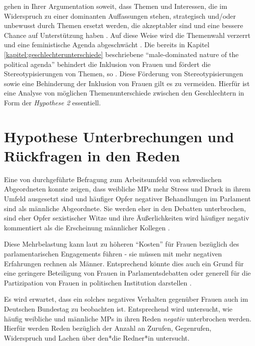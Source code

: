 \documentclass[12pt, 
    twoside=false, 
    bibliography=totoc, 
    numbers=endperiod, 
    headings=normal, 
    toc=chapterentrydotfill
    ]{scrbook}
\begin{document}
\textcite{celis_2018} gehen in Ihrer Argumentation soweit, dass Themen und Interessen, die im Widerspruch zu einer dominanten Auffassungen stehen, strategisch und/oder unbewusst durch Themen ersetzt werden, die akzeptabler sind und eine bessere Chance auf Unterstützung haben \parencites[151]{celis_2018}{swers_2002}. 
Auf diese Weise wird die Themenwahl verzerrt und eine feministische Agenda abgeschwächt \parencite[151]{celis_2018}. Die bereits in Kapitel \ref{kapitel:geschlechterunterschiede} beschriebene \enquote{male-dominated nature of the political agenda} \parencite[151]{celis_2018} behindert die Inklusion von Frauen und fördert die Stereotypisierungen von Themen, so \textcite{celis_2018}.
Diese Förderung von Stereotypisierungen sowie eine Behinderung der Inklusion von Frauen gilt es zu vermeiden. Hierfür ist eine Analyse von möglichen Themenunterschiede zwischen den Geschlechtern in Form der \emph{Hypothese 2} essentiell. 

\section{Hypothese Unterbrechungen und Rückfragen in den Reden}\label{kapitel:hypothese3}

Eine von \textcite{erikson_2018} durchgeführte Befragung zum Arbeitsumfeld von schwedischen Abgeordneten konnte zeigen, dass weibliche MPs mehr Stress und Druck in ihrem Umfeld ausgesetzt sind und häufiger Opfer negativer Behandlungen im Parlament sind als männliche Abgeordnete. Sie werden eher in den Debatten unterbrochen, sind eher Opfer sexistischer Witze und ihre Äußerlichkeiten wird häufiger negativ kommentiert als die Erscheinung männlicher Kollegen \parencite[13]{erikson_2018}.

Diese Mehrbelastung kann laut \textcite{erikson_2018} zu höheren \enquote{Kosten} für Frauen bezüglich des parlamentarischen Engagements führen - sie müssen mit mehr negativen Erfahrungen rechnen als Männer. Entsprechend könnte dies auch ein Grund für eine geringere Beteiligung von Frauen in Parlamentsdebatten oder generell für die Partizipation von Frauen in politischen Institution darstellen \parencites[vgl.][]{erikson_2018}[vgl.][]{back_2014}.

Es wird erwartet, dass ein solches negatives Verhalten gegenüber Frauen auch im Deutschen Bundestag zu beobachten ist. Entsprechend wird untersucht, wie häufig weibliche und männliche MPs in ihren Reden \emph{negativ} unterbrochen werden. Hierfür werden Reden bezüglich der Anzahl an Zurufen, Gegenrufen, Widerspruch und Lachen über den*die Redner*in untersucht.
\end{document}
